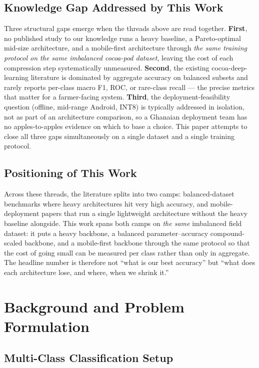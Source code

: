 \documentclass[conference,10pt]{IEEEtran}
\begin{document}
\subsection{Knowledge Gap Addressed by This Work}

Three structural gaps emerge when the threads above are read together.
\textbf{First}, no published study to our knowledge runs a heavy baseline,
a Pareto-optimal mid-size architecture, and a mobile-first architecture
through \emph{the same training protocol on the same imbalanced cocoa-pod
dataset}, leaving the cost of each compression step systematically
unmeasured. \textbf{Second}, the existing cocoa-deep-learning literature
is dominated by aggregate accuracy on balanced subsets and rarely reports
per-class macro F1, ROC, or rare-class recall — the precise metrics that
matter for a farmer-facing system. \textbf{Third}, the deployment-feasibility
question (offline, mid-range Android, INT8) is typically addressed in
isolation, not as part of an architecture comparison, so a Ghanaian
deployment team has no apples-to-apples evidence on which to base a
choice. This paper attempts to close all three gaps simultaneously on a
single dataset and a single training protocol.

\subsection{Positioning of This Work}

Across these threads, the literature splits into two camps: balanced-dataset
benchmarks where heavy architectures hit very high accuracy, and
mobile-deployment papers that run a single lightweight architecture without
the heavy baseline alongside. This work spans both camps on \emph{the same}
imbalanced field dataset: it puts a heavy backbone, a balanced
parameter--accuracy compound-scaled backbone, and a mobile-first backbone
through the same protocol so that the cost of going small can be measured per
class rather than only in aggregate. The headline number is therefore not
``what is our best accuracy'' but ``what does each architecture lose, and
where, when we shrink it.''

\section{Background and Problem Formulation}\label{sec:background}

\subsection{Multi-Class Classification Setup}
\end{document}
